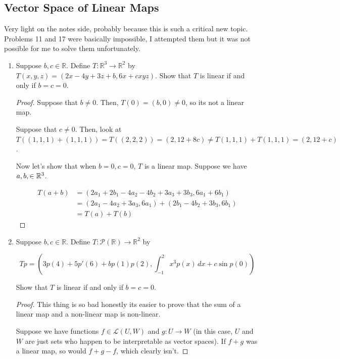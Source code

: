 \subsection{Vector Space of Linear Maps}

Very light on the notes side, probably because this is such a critical new topic. Problems 11 and 17 were basically impossible, I attempted them but it was not possible for me to solve them unfortunately.


\begin{enumerate}
    \item Suppose $b, c \in \mathbb{R}$. Define $T \colon \mathbb{R}^3 \to \mathbb{R}^2$ by
$T(x, y, z) = (2x - 4y + 3z + b, 6x + cxyz)$.
Show that $T$ is linear if and only if $b = c = 0$.

    \begin{proof}
        Suppose that $b \neq 0$. Then, $T(0) = (b, 0) \neq 0$, so its not a linear map. 

        Suppose that $c \neq 0$. Then, look at $T((1, 1, 1) + (1, 1, 1)) = T((2, 2, 2)) = (2, 12 + 8c) \neq T(1, 1, 1) + T(1, 1, 1) = (2, 12 + c)$.

        Now let's show that when $b = 0, c = 0$, $T$ is a linear map. Suppose we have $a, b, \in \mathbb{R}^3$. 

        \begin{align*}
            T(a + b) &= (2a_1 + 2b_1 - 4a_2 - 4b_2 + 3a_3 + 3b_3, 6a_1 + 6b_1) \\
            &= (2a_1 - 4a_2 + 3a_3, 6a_1) + (2b_1 - 4b_2 + 3b_3, 6b_1) \\
            &= T(a) + T(b) 
        \end{align*}
    \end{proof}


    \item Suppose $b, c \in \mathbb{R}$. Define $T \colon \mathcal{P}(\mathbb{R}) \to \mathbb{R}^2$ by
    
$$Tp = \left(3p(4) + 5p'(6) + bp(1)p(2), \int_{-1}^{2} x^3 p(x) \, dx + c \sin p(0)\right)$$

Show that $T$ is linear if and only if $b = c = 0$.

\begin{proof}
    This thing is so bad honestly its easier to prove that the sum of a linear map and a non-linear map is non-linear. 

    Suppose we have functions $f \in \mathcal L(U, W)$ and $g: U \to W$ (in this case, $U$ and $W$ are just sets who happen to be interpretable as vector spaces). If $f + g$ was a linear map, so would $f + g - f$, which clearly isn't.


\end{proof}
\end{enumerate}
